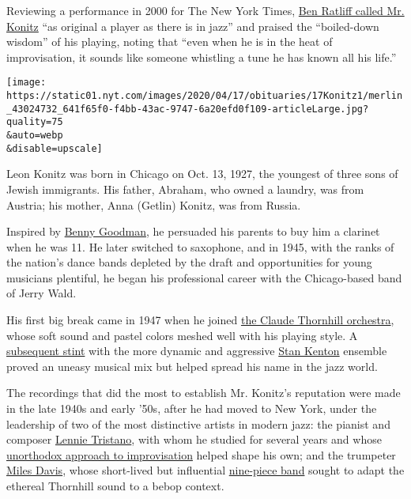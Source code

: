 Reviewing a performance in 2000 for The New York Times,
\href{https://www.nytimes.com/2000/05/13/arts/jazz-review-writing-their-own-ticket-on-an-original-of-the-past.html}{Ben
Ratliff called Mr. Konitz} ``as original a player as there is in jazz''
and praised the ``boiled-down wisdom'' of his playing, noting that
``even when he is in the heat of improvisation, it sounds like someone
whistling a tune he has known all his life.''

\texttt{[image: https://static01.nyt.com/images/2020/04/17/obituaries/17Konitz1/merlin\_43024732\_641f65f0-f4bb-43ac-9747-6a20efd0f109-articleLarge.jpg?quality=75\\\&auto=webp\\\&disable=upscale]}

Leon Konitz was born in Chicago on Oct. 13, 1927, the youngest of three
sons of Jewish immigrants. His father, Abraham, who owned a laundry, was
from Austria; his mother, Anna (Getlin) Konitz, was from Russia.

Inspired by
\href{https://www.nytimes.com/1986/06/14/obituaries/benny-goodman-king-of-swing-is-dead.html}{Benny
Goodman}, he persuaded his parents to buy him a clarinet when he was 11.
He later switched to saxophone, and in 1945, with the ranks of the
nation's dance bands depleted by the draft and opportunities for young
musicians plentiful, he began his professional career with the
Chicago-based band of Jerry Wald.

His first big break came in 1947 when he joined
\href{https://www.youtube.com/watch?v=oX05oHu63JE}{the Claude Thornhill
orchestra}, whose soft sound and pastel colors meshed well with his
playing style. A
\href{https://www.youtube.com/watch?v=YHxdZARIbSQ}{subsequent stint}
with the more dynamic and aggressive
\href{https://www.nytimes.com/1979/08/27/archives/stan-kenton-band-leader-dies-was-center-of-jazz-controversies-in-an.html}{Stan
Kenton} ensemble proved an uneasy musical mix but helped spread his name
in the jazz world.

The recordings that did the most to establish Mr. Konitz's reputation
were made in the late 1940s and early '50s, after he had moved to New
York, under the leadership of two of the most distinctive artists in
modern jazz: the pianist and composer
\href{https://www.nytimes.com/1978/11/20/archives/lennie-tristano-at-59-pianist-was-innovator-in-the-cool-jazz-era.html}{Lennie
Tristano}, with whom he studied for several years and whose
\href{https://www.youtube.com/watch?v=bznqGjyYuRk}{unorthodox approach
to improvisation} helped shape his own; and the trumpeter
\href{https://www.nytimes.com/1991/09/29/nyregion/miles-davis-trumpeter-dies-jazz-genius-65-defined-cool.html}{Miles
Davis}, whose short-lived but influential
\href{https://www.youtube.com/watch?v=tMPdP6-lrmc}{nine-piece band}
sought to adapt the ethereal Thornhill sound to a bebop context.

